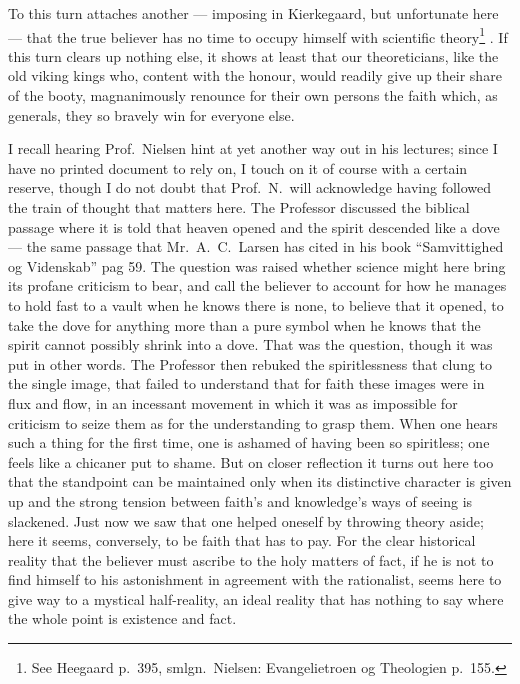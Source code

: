 \documentclass[12pt,a4paper]{book}
\renewcommand{\thefootnote}{*)}
\newcommand{\fnmark}[2]{\renewcommand{\thefootnote}{#1}\footnote{#2}%
  \renewcommand{\thefootnote}{*)}}
\newcommand{\opage}[1]{\marginnote{\footnotesize\textit{[#1]}}}
\begin{document}
To this turn attaches another --- imposing in Kierkegaard, but unfortunate
here --- that the true believer has no time to occupy himself with
\opage{70}scientific theory\fnmark{*)}{See Heegaard p.\ 395, smlgn.\ Nielsen:
Evangelietroen og Theologien p.\ 155.}. If this turn clears up nothing else, it
shows at least that our theoreticians, like the old viking kings who, content
with the honour, would readily give up their share of the booty, magnanimously
renounce for their own persons the faith which, as generals, they so bravely
win for everyone else.

I recall hearing Prof.\ Nielsen hint at yet another way out in his lectures;
since I have no printed document to rely on, I touch on it of course with a
certain reserve, though I do not doubt that Prof.\ N.\ will acknowledge having
followed the train of thought that matters here. The Professor discussed the
biblical passage where it is told that heaven opened and the spirit descended
like a dove --- the same passage that Mr.\ A.\ C.\ Larsen has cited in his book
``Samvittighed og Videnskab'' pag 59. The question was raised whether science
might here bring its profane criticism to bear, and call the believer to
account for how he manages to hold fast to a vault when he knows there is none,
to believe that it opened, to take the dove for anything more than a pure
symbol when he knows that the spirit cannot possibly shrink into a dove. That
was the question, though it was put in other words. The Professor then rebuked
the spiritlessness that
\opage{71}clung to the single image, that failed to understand that for faith
these images were in flux and flow, in an incessant movement in which it was as
impossible for criticism to seize them as for the understanding to grasp them.
When one hears such a thing for the first time, one is ashamed of having been
so spiritless; one feels like a chicaner put to shame. But on closer
reflection it turns out here too that the standpoint can be maintained only
when its distinctive character is given up and the strong tension between
faith's and knowledge's ways of seeing is slackened. Just now we saw that one
helped oneself by throwing theory aside; here it seems, conversely, to be faith
that has to pay. For the clear historical reality that the believer must ascribe
to the holy matters of fact, if he is not to find himself to his astonishment
in agreement with the rationalist, seems here to give way to a mystical
half-reality, an ideal reality that has nothing to say where the whole point is
existence and fact.
\end{document}
